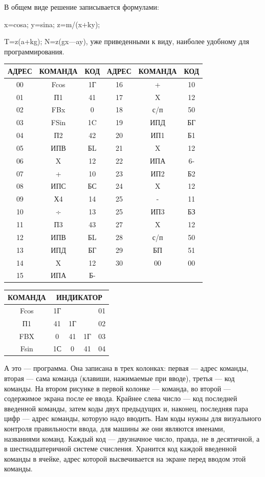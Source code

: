 \documentclass[11pt,a4paper,oneside]{article}
\begin{document}
В общем виде решение записывается формулами:

x=cosa; y=sina; z=m/(x+ky);

T=z(a+kg); N=z(gx—ay), уже приведенными к виду, наиболее удобному для программирования.

\begin{tabular}{|c|c|c|c|c|c|}\hline
АДРЕС & КОМАНДА & КОД & АДРЕС & КОМАНДА & КОД \\\hline
00 & Fcos & 1Г & 16 & + & 10 \\\hline
01 & П1 & 41 & 17 & X & 12 \\\hline
02 & FBx & 0 & 18 & с/п & 50 \\\hline
03 & FSin & 1C & 19 & ИПД & БГ \\\hline
04 & П2 & 42 & 20 & ИП1 & Б1 \\\hline
05 & ИПВ & БL & 21 & X & 12 \\\hline
06 & X & 12 & 22 & ИПА & 6- \\\hline
07 & + & 10 & 23 & ИП2 & Б2 \\\hline
08 & ИПС & БС & 24 & X & 12 \\\hline
09 & Х4 & 14 & 25 & - & 11 \\\hline
10 & ÷ & 13 & 25 & ИП3 & БЗ \\\hline
11 & П3 & 43 & 27 & X & 12 \\\hline
12 & ИПВ & БL & 28 & с/п & 50 \\\hline
13 & ИПД & БГ & 29 & БП & 51 \\\hline
14 & X & 12 & 30 & 00 & 00 \\\hline
15 & ИПА & Б- & & & \\\hline
\end{tabular}

\begin{tabular}{|c|c|c|c|c|}\hline
КОМАНДА & \multicolumn{4}{|c|}{ИНДИКАТОР} \\\hline
Fcos & 1Г & & & 01 \\
П1 & 41 & 1Г & & 02 \\
FBX & 0 & 41 & 1Г & 03 \\
Fsin & 1С & 0 & 41 & 04 \\\hline
\end{tabular}

А это — программа. Она записана в трех колонках: первая — адрес команды, вторая — сама команда (клавиши, нажимаемые при вводе), третья — код команды. На втором рисунке в первой колонке — команда, во второй — содержимое экрана после ее ввода. Крайнее слева число — код последней введенной команды, затем коды двух предыдущих и, наконец, последняя пара цифр — адрес команды, которую надо вводить. Нам коды нужны для визуального контроля правильности ввода, для машины же они являются именами, названиями команд. Каждый код — двузначное число, правда, не в десятичной, а в шестнадцатеричной системе счисления. Хранится код каждой введенной команды в ячейке, адрес которой высвечивается на экране перед вводом этой команды.
\end{document}
